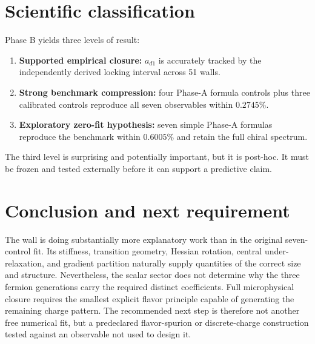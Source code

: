 \documentclass[11pt]{article}
\begin{document}
\section{Scientific classification}
Phase B yields three levels of result:
\begin{enumerate}
\item \textbf{Supported empirical closure:} $a_{d1}$ is accurately tracked by the independently derived locking interval across 51 walls.
\item \textbf{Strong benchmark compression:} four Phase-A formula controls plus three calibrated controls reproduce all seven observables within $0.2745\%$.
\item \textbf{Exploratory zero-fit hypothesis:} seven simple Phase-A formulas reproduce the benchmark within $0.6005\%$ and retain the full chiral spectrum.
\end{enumerate}
The third level is surprising and potentially important, but it is post-hoc.  It must be frozen and tested externally before it can support a predictive claim.

\section{Conclusion and next requirement}
The wall is doing substantially more explanatory work than in the original seven-control fit.  Its stiffness, transition geometry, Hessian rotation, central under-relaxation, and gradient partition naturally supply quantities of the correct size and structure.  Nevertheless, the scalar sector does not determine why the three fermion generations carry the required distinct coefficients.  Full microphysical closure requires the smallest explicit flavor principle capable of generating the remaining charge pattern.  The recommended next step is therefore not another free numerical fit, but a predeclared flavor-spurion or discrete-charge construction tested against an observable not used to design it.
\end{document}
